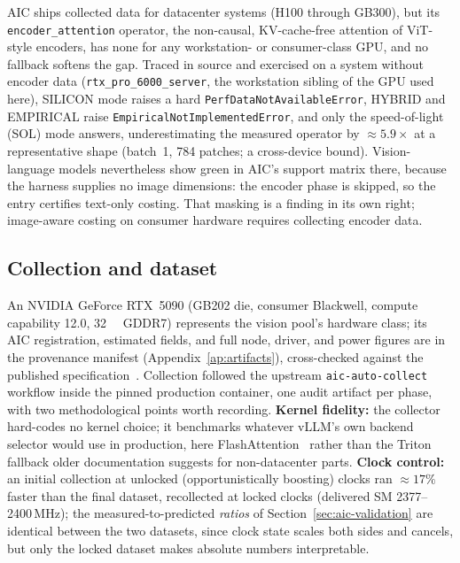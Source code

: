 AIC ships collected data for datacenter systems (H100 through GB300), but
its \texttt{encoder\_attention} operator, the non-causal, KV-cache-free
attention of ViT-style encoders, has none for any workstation- or
consumer-class GPU, and no fallback softens the gap. Traced in source and
exercised on a system without encoder data
(\texttt{rtx\_pro\_6000\_server}, the workstation sibling of the GPU used
here), SILICON mode raises a hard \texttt{PerfDataNotAvailableError}, HYBRID
and EMPIRICAL raise \texttt{EmpiricalNotImplementedError}, and only the
speed-of-light (SOL) mode answers, underestimating the measured operator
by ${\approx}5.9\times$ at a representative shape (batch~1, 784 patches; a
cross-device bound). Vision-language models nevertheless show green in AIC's
support matrix there, because the harness supplies no image dimensions: the
encoder phase is skipped, so the entry certifies text-only costing. That
masking is a finding in its own right; image-aware costing on consumer
hardware requires collecting encoder data.

\subsection{Collection and dataset}

An NVIDIA GeForce RTX~5090 (GB202 die, consumer Blackwell, compute
capability 12.0, \SI{32}{\gibi\byte} GDDR7) represents the vision pool's
hardware class; its AIC registration, estimated fields, and full node,
driver, and power figures are in the provenance manifest
(Appendix~\ref{ap:artifacts}), cross-checked against the published
specification~\cite{NVIDIA5090Specs}. Collection followed the upstream
\texttt{aic-auto-collect} workflow inside the pinned production container,
one audit artifact per phase, with two methodological points worth
recording. \textbf{Kernel fidelity:} the collector hard-codes no
kernel choice; it benchmarks whatever vLLM's own backend selector would
use in production, here FlashAttention~\cite{Dao2023FlashAttention2} rather
than the Triton fallback older documentation suggests for non-datacenter
parts. \textbf{Clock control:} an initial collection at unlocked
(opportunistically boosting) clocks ran ${\approx}17\%$ faster than the
final dataset, recollected at locked clocks (delivered SM
2377--2400\,\si{\mega\hertz}); the measured-to-predicted \emph{ratios} of
Section~\ref{sec:aic-validation} are identical between the two datasets,
since clock state scales both sides and cancels, but only the locked dataset
makes absolute numbers interpretable.

